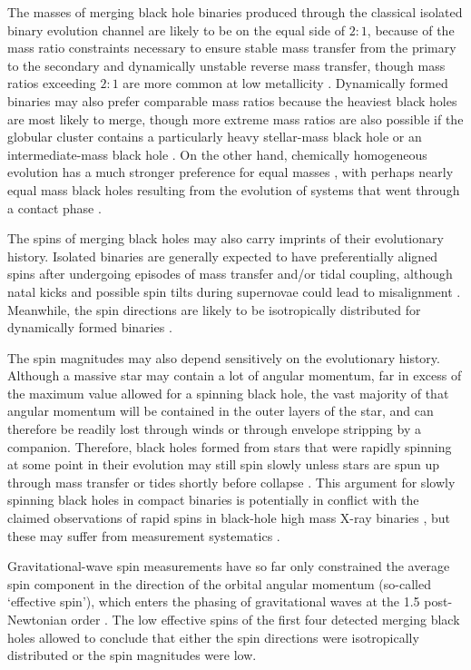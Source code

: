 \documentclass[iop,onecolumn]{revtex4}
\begin{document}
The masses of merging black hole binaries produced through the classical isolated binary evolution channel are likely to be on the equal side of $2:1$, because of the mass ratio constraints necessary to ensure stable mass transfer from the primary to the secondary and dynamically unstable reverse mass transfer, though mass ratios exceeding $2:1$ are more common at low metallicity \citep{Dominik:2012,Stevenson:2017}.  Dynamically formed binaries may also prefer comparable mass ratios because the heaviest black holes are most likely to merge, though more extreme mass ratios are also possible if the globular cluster contains a particularly heavy stellar-mass black hole or an intermediate-mass black hole \citep{Mandel:2008,Belczynski:2014VMS}.  On the other hand, chemically homogeneous evolution has a much stronger preference for equal masses \citep{MandeldeMink:2016}, with perhaps nearly equal mass black holes resulting from the evolution of systems that went through a contact phase \citep{Marchant:2016}.  

The spins of merging black holes may also carry imprints of their evolutionary history.  Isolated binaries are generally expected to have preferentially aligned spins after undergoing episodes of mass transfer and/or tidal coupling, although natal kicks and possible spin tilts during supernovae could lead to misalignment \citep[e.g.,][]{Farr:2011}.  Meanwhile, the spin directions are likely to be isotropically distributed for dynamically formed binaries \citep[e.g.,][]{Rodriguez:2016spin}.  

The spin magnitudes may also depend sensitively on the evolutionary history.  Although a massive star may contain a lot of angular momentum, far in excess of the maximum value allowed for a spinning black hole, the vast majority of that angular momentum will be contained in the outer layers of the star, and can therefore be readily lost through winds or through envelope stripping by a companion.  Therefore, black holes formed from stars that were rapidly spinning at some point in their evolution may still spin slowly unless stars are spun up through mass transfer or tides shortly before collapse \citep{Kushnir:2016,HotokezakaPiran:2017,Zaldarriaga:2017}.   This argument for slowly spinning black holes in compact binaries is potentially in conflict with the claimed observations of rapid spins in black-hole high mass X-ray binaries \citep{MillerMiller:2015}, but these may suffer from measurement systematics \citep[e.g.,][]{Kawano:2017}.  

Gravitational-wave spin measurements have so far only constrained the average spin component in the direction of the orbital angular momentum (so-called `effective spin'), which enters the phasing of gravitational waves at the 1.5 post-Newtonian order \citep{PoissonWill:1995}.  The low effective spins of the first four detected merging black holes allowed \citet{Farr:2017} to conclude that either the spin directions were isotropically distributed or the spin magnitudes were low.
\end{document}
